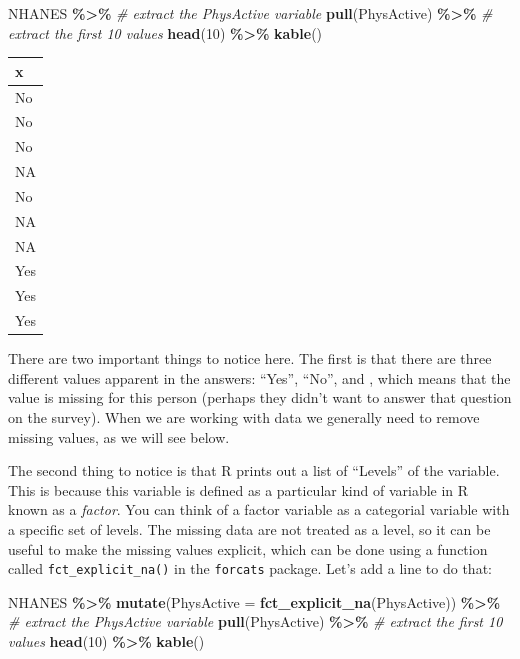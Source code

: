 \documentclass[
  12pt,
]{book}
\newenvironment{Shaded}{\begin{snugshade}}{\end{snugshade}}
\newcommand{\AttributeTok}[1]{\textcolor[rgb]{0.13,0.29,0.53}{#1}}
\newcommand{\CommentTok}[1]{\textcolor[rgb]{0.56,0.35,0.01}{\textit{#1}}}
\newcommand{\DecValTok}[1]{\textcolor[rgb]{0.00,0.00,0.81}{#1}}
\newcommand{\FunctionTok}[1]{\textcolor[rgb]{0.13,0.29,0.53}{\textbf{#1}}}
\newcommand{\NormalTok}[1]{#1}
\newcommand{\SpecialCharTok}[1]{\textcolor[rgb]{0.81,0.36,0.00}{\textbf{#1}}}
\begin{document}
\begin{Shaded}
\begin{Highlighting}[]
\NormalTok{NHANES }\SpecialCharTok{\%\textgreater{}\%}
  \CommentTok{\# extract the PhysActive variable}
  \FunctionTok{pull}\NormalTok{(PhysActive) }\SpecialCharTok{\%\textgreater{}\%}
  \CommentTok{\# extract the first 10 values }
  \FunctionTok{head}\NormalTok{(}\DecValTok{10}\NormalTok{) }\SpecialCharTok{\%\textgreater{}\%}
  \FunctionTok{kable}\NormalTok{()}
\end{Highlighting}
\end{Shaded}

\begin{tabular}{l}
\hline
x\\
\hline
No\\
\hline
No\\
\hline
No\\
\hline
NA\\
\hline
No\\
\hline
NA\\
\hline
NA\\
\hline
Yes\\
\hline
Yes\\
\hline
Yes\\
\hline
\end{tabular}

There are two important things to notice here. The first is that there are three different values apparent in the answers: ``Yes'', ``No'', and , which means that the value is missing for this person (perhaps they didn't want to answer that question on the survey). When we are working with data we generally need to remove missing values, as we will see below.

The second thing to notice is that R prints out a list of ``Levels'' of the variable. This is because this variable is defined as a particular kind of variable in R known as a \emph{factor}. You can think of a factor variable as a categorial variable with a specific set of levels. The missing data are not treated as a level, so it can be useful to make the missing values explicit, which can be done using a function called \texttt{fct\_explicit\_na()} in the \texttt{forcats} package. Let's add a line to do that:

\begin{Shaded}
\begin{Highlighting}[]
\NormalTok{NHANES }\SpecialCharTok{\%\textgreater{}\%}
  \FunctionTok{mutate}\NormalTok{(}\AttributeTok{PhysActive =} \FunctionTok{fct\_explicit\_na}\NormalTok{(PhysActive)) }\SpecialCharTok{\%\textgreater{}\%}
  \CommentTok{\# extract the PhysActive variable}
  \FunctionTok{pull}\NormalTok{(PhysActive) }\SpecialCharTok{\%\textgreater{}\%}
  \CommentTok{\# extract the first 10 values }
  \FunctionTok{head}\NormalTok{(}\DecValTok{10}\NormalTok{) }\SpecialCharTok{\%\textgreater{}\%}
  \FunctionTok{kable}\NormalTok{()}
\end{Highlighting}
\end{Shaded}
\end{document}
